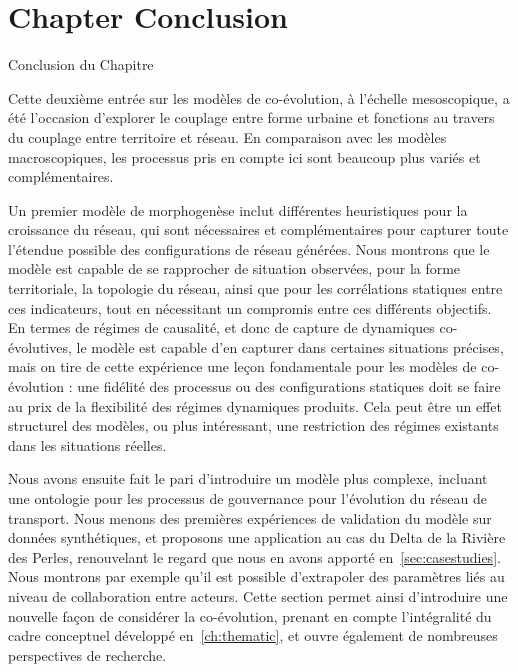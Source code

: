 

\newpage


\section*{Chapter Conclusion}{Conclusion du Chapitre}


Cette deuxième entrée sur les modèles de co-évolution, à l'échelle mesoscopique, a été l'occasion d'explorer le couplage entre forme urbaine et fonctions au travers du couplage entre territoire et réseau. En comparaison avec les modèles macroscopiques, les processus pris en compte ici sont beaucoup plus variés et complémentaires.

Un premier modèle de morphogenèse inclut différentes heuristiques pour la croissance du réseau, qui sont nécessaires et complémentaires pour capturer toute l'étendue possible des configurations de réseau générées. Nous montrons que le modèle est capable de se rapprocher de situation observées, pour la forme territoriale, la topologie du réseau, ainsi que pour les corrélations statiques entre ces indicateurs, tout en nécessitant un compromis entre ces différents objectifs. En termes de régimes de causalité, et donc de capture de dynamiques co-évolutives, le modèle est capable d'en capturer dans certaines situations précises, mais on tire de cette expérience une leçon fondamentale pour les modèles de co-évolution : une fidélité des processus ou des configurations statiques doit se faire au prix de la flexibilité des régimes dynamiques produits. Cela peut être un effet structurel des modèles, ou plus intéressant, une restriction des régimes existants dans les situations réelles.


Nous avons ensuite fait le pari d'introduire un modèle plus complexe, incluant une ontologie pour les processus de gouvernance pour l'évolution du réseau de transport. Nous menons des premières expériences de validation du modèle sur données synthétiques, et proposons une application au cas du Delta de la Rivière des Perles, renouvelant le regard que nous en avons apporté en~\ref{sec:casestudies}. Nous montrons par exemple qu'il est possible d'extrapoler des paramètres liés au niveau de collaboration entre acteurs. Cette section permet ainsi d'introduire une nouvelle façon de considérer la co-évolution, prenant en compte l'intégralité du cadre conceptuel développé en~\ref{ch:thematic}, et ouvre également de nombreuses perspectives de recherche.




\stars
